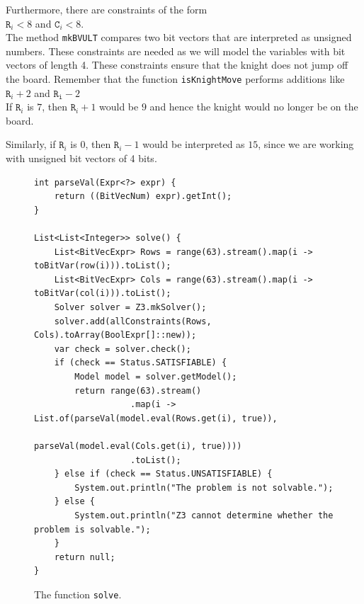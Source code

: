 \begin{enumerate}
      Furthermore, there are constraints of the form
      \\[0.2cm]
      \hspace*{1.3cm}
      $\mathtt{R}_i < 8$ \quad and \quad $\mathtt{C}_i < 8$.
      \\[0.2cm]
      The method \texttt{mkBVULT} compares two bit vectors that are interpreted as unsigned numbers.
      These constraints are needed as we will model the variables with bit vectors of length 4.
      These constraints ensure that the knight does not jump off the board.  Remember that the function
      \texttt{isKnightMove} performs additions like
      \\[0.2cm]
      \hspace*{1.3cm}
      $\mathtt{R}_i + 2$ \quad and \quad $\mathtt{R_i} - 2$
      \\[0.2cm]
      If $\mathtt{R}_i$ is $7$, then $\mathtt{R}_i + 1$ would be $9$ and hence the knight would no longer be on
      the board.

      Similarly, if $\mathtt{R}_i$ is $0$, then $\mathtt{R}_i - 1$ would be interpreted as $15$,
      since we are working with unsigned bit vectors of 4 bits.
\end{enumerate}

\begin{figure}[!ht]
\centering
\begin{verbatim}
int parseVal(Expr<?> expr) {
    return ((BitVecNum) expr).getInt();
}

List<List<Integer>> solve() {
    List<BitVecExpr> Rows = range(63).stream().map(i -> toBitVar(row(i))).toList();
    List<BitVecExpr> Cols = range(63).stream().map(i -> toBitVar(col(i))).toList();
    Solver solver = Z3.mkSolver();
    solver.add(allConstraints(Rows, Cols).toArray(BoolExpr[]::new));
    var check = solver.check();
    if (check == Status.SATISFIABLE) {
        Model model = solver.getModel();
        return range(63).stream()
                   .map(i -> List.of(parseVal(model.eval(Rows.get(i), true)),
                                     parseVal(model.eval(Cols.get(i), true))))
                   .toList();
    } else if (check == Status.UNSATISFIABLE) {
        System.out.println("The problem is not solvable.");
    } else {
        System.out.println("Z3 cannot determine whether the problem is solvable.");
    }
    return null;
}
\end{verbatim}
\vspace*{-0.3cm}
\caption{The function \texttt{solve}.}
\label{fig:Knight's Tour with Z3.ipynb-2}
\end{figure}

